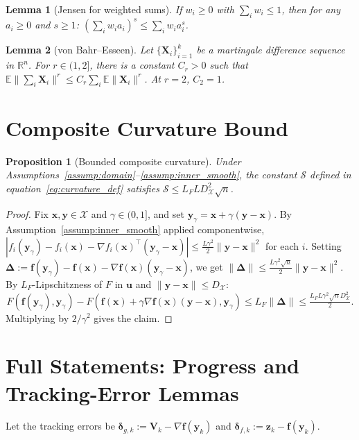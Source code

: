 \documentclass{article}
\def\eqref#1{equation~\ref{#1}}
\newcommand{\cX}{\mathcal{X}}
\def\vf{{\bm{f}}}
\def\vu{{\bm{u}}}
\def\vx{{\bm{x}}}
\def\vy{{\bm{y}}}
\def\vz{{\bm{z}}}
\def\vX{{\bm{X}}}
\def\mV{{\bm{V}}}
\newcommand{\E}{\mathbb{E}}
\newcommand{\R}{\mathbb{R}}
\newtheorem{lemma}{Lemma}
\newtheorem{proposition}{Proposition}
\begin{document}
\begin{lemma}[Jensen for weighted sums] \label{lem:jensen}
If $w_i \ge 0$ with $\sum_i w_i \le 1$, then for any $a_i \ge 0$ and $s \ge 1$: $(\sum_i w_i a_i)^s \le \sum_i w_i a_i^s$.
\end{lemma}

\begin{lemma}[von Bahr--Esseen] \label{lem:vbe}
Let $\{\vX_i\}_{i=1}^k$ be a martingale difference sequence in $\R^n$. For $r \in (1, 2]$, there is a constant $C_r > 0$ such that $\E\|\sum_i \vX_i\|^r \le C_r \sum_i \E\|\vX_i\|^r$. At $r = 2$, $C_2 = 1$.
\end{lemma}

\section{Composite Curvature Bound} \label{sec:curvature_appendix}

\begin{proposition}[Bounded composite curvature] \label{prop:curvature}
Under Assumptions~\ref{assump:domain}--\ref{assump:inner_smooth}, the constant $\mathcal{S}$ defined in \eqref{eq:curvature_def} satisfies $\mathcal{S} \le L_F L D_{\cX}^2 \sqrt{n}$.
\end{proposition}

\begin{proof}
Fix $\vx, \vy \in \cX$ and $\gamma \in (0, 1]$, and set $\vy_\gamma = \vx + \gamma(\vy - \vx)$. By Assumption~\ref{assump:inner_smooth} applied componentwise, $|f_i(\vy_\gamma) - f_i(\vx) - \nabla f_i(\vx)^\top (\vy_\gamma - \vx)| \le \tfrac{L\gamma^2}{2} \|\vy - \vx\|^2$ for each $i$. Setting $\bm\Delta := \vf(\vy_\gamma) - \vf(\vx) - \nabla \vf(\vx)(\vy_\gamma - \vx)$, we get $\|\bm\Delta\| \le \tfrac{L\gamma^2 \sqrt{n}}{2} \|\vy - \vx\|^2$. By $L_F$-Lipschitzness of $F$ in $\vu$ and $\|\vy - \vx\| \le D_{\cX}$:
\[
F(\vf(\vy_\gamma), \vy_\gamma) - F(\vf(\vx) + \gamma\nabla\vf(\vx)(\vy - \vx), \vy_\gamma) \le L_F \|\bm\Delta\| \le \tfrac{L_F L \gamma^2 \sqrt{n} D_\cX^2}{2}.
\]
Multiplying by $2/\gamma^2$ gives the claim.
\end{proof}

\section{Full Statements: Progress and Tracking-Error Lemmas} \label{sec:lemmas_appendix}

Let the tracking errors be $\bm{\delta}_{g,k} := \mV_k - \nabla \vf(\vy_k)$ and $\bm{\delta}_{f,k} := \vz_k - \vf(\vy_k)$.
\end{document}
